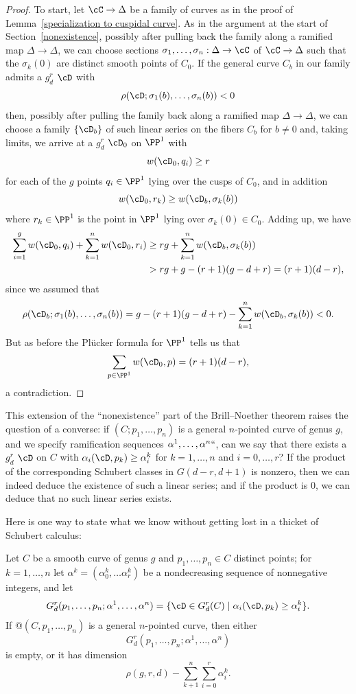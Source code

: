 \begin{proof}
To start, let $\cC \to \Delta$ be a family of curves as in the proof of
Lemma~\ref{specialization to cuspidal curve}.
As in the argument
at the start of Section~\ref{nonexistence},
possibly
after pulling back the family along a ramified map $\Delta \to \Delta$,
we can choose sections $\sigma_1, \dots, \sigma_n : \Delta \to \cC$
of $\cC \to \Delta$ such that the $\sigma_k(0)$ are distinct smooth
points of $C_0$.
If the general curve $C_b$ in our family admits a $g^r_d$ $\cD$ with
$$
\rho(\cD;\sigma_1(b),\dots,\sigma_n(b)) < 0
$$
then, possibly after pulling the family back along a ramified map $\Delta
\to \Delta$, we can choose a family $\{\cD_b\}$ of such linear series
on the fibers $C_b$ for $b \neq 0$ and, taking limits, we arrive at a
$g^r_d$ $\cD_0$ on $\PP^1$ with
$$
w(\cD_0, q_i) \geq r
$$
for each of the $g$ points $q_i \in \PP^1$ lying over the cusps of $C_0$,
and in addition
$$
w(\cD_0, r_k) \geq w(\cD_b,\sigma_k(b))
$$
where $r_k \in \PP^1$ is the point in $\PP^1$ lying over $\sigma_k(0)
\in C_0$. Adding up, we have
\begin{align*}
\sum_{i=1}^g w(\cD_0, q_i) + \sum_{k=1}^n w(\cD_0, r_i) &\geq rg +
\sum_{k=1}^n w(\cD_b,\sigma_k(b)) \\
&> rg + g - (r+1)(g-d+r) = (r+1)(d-r)
,
\end{align*}
since we assumed that
$$
\rho(\cD_b;\sigma_1(b),\dots,\sigma_n(b)) = g - (r+1)(g-d+r) -
\sum_{k=1}^n w(\cD_b,\sigma_k(b)) < 0.
$$
But as before the Pl\"ucker formula for $\PP^1$ tells us that
$$
\sum_{p \in \PP^1} w(\cD_0, p) = (r+1)(d-r),
$$
a contradiction.
\end{proof}

This extension of the ``nonexistence'' part of
the Brill--Noether theorem
raises
the question of a converse: if $(C;p_1,\dots,p_n)$ is a general
$n$-pointed curve of genus $g$, and we specify ramification sequences
$\alpha^1, \dots, \alpha^n` `$, can we say that there exists a $g^r_d$
$\cD$ on $C$ with $\alpha_i(\cD, p_k) \geq \alpha^k_i$ for
$k=1,\dots,n$ and $i = 0, \dots, r$? If the product of the
corresponding
Schubert classes
%
in $G(d-r, d+1)$ is nonzero, then we
can indeed deduce the existence of such a linear series; and if the
product is 0, we can deduce that no such linear series exists.

Here is one way to state what we know without getting lost in a thicket
of Schubert calculus:

\begin{theorem}\label{BN with inflection and dimension}
Let $C$ be a smooth curve of genus $g$ and $p_1,\dots,p_n \in C$ distinct
points; for $k = 1,\dots,n$ let $\alpha^k = (\alpha^k_0,\dots\alpha^k_r)$
be a nondecreasing sequence of nonnegative integers, and let
$$
G^r_d(p_1,\dots,p_n; \alpha^1,\dots,\alpha^n) = \{\cD \in G^r_d(C)
\mid \alpha_i(\cD, p_k) \geq \alpha^k_i \}.
$$
If $@(C, p_1,\dots,p_n)$ is a general $n$-pointed curve,
then either
$$
G^r_d(p_1,\dots,p_n; \alpha^1,\dots,\alpha^n)
$$
is empty, or it has dimension
$$
\rho(g,r,d) -
\sum_{k+1}^n \sum_{i=0}^r \alpha^k_i.
$$
\end{theorem}

